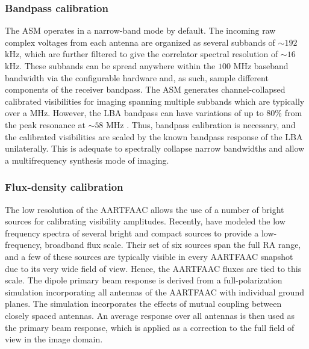 \documentclass{aa}
\begin{document}

\subsubsection{Bandpass calibration}

The ASM  operates in a  narrow-band mode by  default.  The incoming  raw complex
voltages from each antenna are organized as several subbands of $\sim$$192$ kHz,
which  are  further filtered  to  give  the  correlator spectral  resolution  of
$\sim$$16$  kHz. These  subbands can  be spread  anywhere within  the  $100$ MHz
baseband bandwidth via the configurable  hardware and, as such, sample different
components  of  the  receiver  bandpass.  The  ASM  generates  channel-collapsed
calibrated  visibilities  for  imaging  spanning  multiple  subbands  which  are
typically over  a MHz. However,  the LBA bandpass  can have variations of  up to
80\%  from the  peak  resonance at  $\sim$$58$ MHz  \citep{vanhaarlem2013lofar}.
Thus,  bandpass calibration is  necessary, and  the calibrated  visibilities are
scaled by the known bandpass response  of the LBA unilaterally. This is adequate
to spectrally collapse narrow  bandwidths and allow a multifrequency synthesis
mode of imaging.


\subsubsection{Flux-density calibration}

The low resolution of the AARTFAAC allows  the use of a number of bright sources
for calibrating  visibility amplitudes.  Recently,  \citet{scaife2012broad} have
modeled  the low  frequency spectra  of several  bright and  compact  sources to
provide a low-frequency, broadband flux scale. Their set of six sources span the
full  RA range,  and  a few  of these  sources  are typically  visible in  every
AARTFAAC  snapshot due  to its  very wide  field of  view.  Hence,  the AARTFAAC
fluxes are tied to this scale.  The dipole primary beam response is derived from
a full-polarization  simulation incorporating all antennas of  the AARTFAAC with
individual  ground planes.  The  simulation incorporates  the effects  of mutual
coupling between closely spaced antennas.  An average response over all antennas
is then used as  the primary beam response, which is applied  as a correction to
the full field of view in the image domain.
\end{document}
